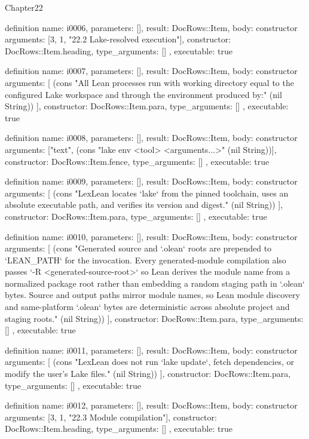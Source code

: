 \begin{lexlean}{Chapter22}
\begin{semanticmodule}
definition{
  name: i0006,
  parameters: [],
  result: DocRows::Item,
  body: constructor{
    arguments: [3, 1, "22.2 Lake-resolved execution"],
    constructor: DocRows::Item.heading,
    type_arguments: []
  },
  executable: true
}

definition{
  name: i0007,
  parameters: [],
  result: DocRows::Item,
  body: constructor{
    arguments: [
      (cons "All Lean processes run with working directory equal to the configured Lake workspace and through the environment produced by:" (nil String))
    ],
    constructor: DocRows::Item.para,
    type_arguments: []
  },
  executable: true
}

definition{
  name: i0008,
  parameters: [],
  result: DocRows::Item,
  body: constructor{
    arguments: ["text", (cons "lake env <tool> <arguments...>" (nil String))],
    constructor: DocRows::Item.fence,
    type_arguments: []
  },
  executable: true
}

definition{
  name: i0009,
  parameters: [],
  result: DocRows::Item,
  body: constructor{
    arguments: [
      (cons "LexLean locates `lake` from the pinned toolchain, uses an absolute executable path, and verifies its version and digest." (nil String))
    ],
    constructor: DocRows::Item.para,
    type_arguments: []
  },
  executable: true
}

definition{
  name: i0010,
  parameters: [],
  result: DocRows::Item,
  body: constructor{
    arguments: [
      (cons "Generated source and `.olean` roots are prepended to `LEAN_PATH` for the invocation. Every generated-module compilation also passes `-R <generated-source-root>` so Lean derives the module name from a normalized package root rather than embedding a random staging path in `.olean` bytes. Source and output paths mirror module names, so Lean module discovery and same-platform `.olean` bytes are deterministic across absolute project and staging roots." (nil String))
    ],
    constructor: DocRows::Item.para,
    type_arguments: []
  },
  executable: true
}

definition{
  name: i0011,
  parameters: [],
  result: DocRows::Item,
  body: constructor{
    arguments: [
      (cons "LexLean does not run `lake update`, fetch dependencies, or modify the user's Lake files." (nil String))
    ],
    constructor: DocRows::Item.para,
    type_arguments: []
  },
  executable: true
}

definition{
  name: i0012,
  parameters: [],
  result: DocRows::Item,
  body: constructor{
    arguments: [3, 1, "22.3 Module compilation"],
    constructor: DocRows::Item.heading,
    type_arguments: []
  },
  executable: true
}


\end{semanticmodule}
\end{lexlean}
